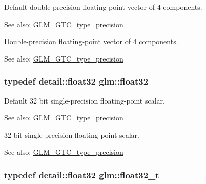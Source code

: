 Default double-precision floating-point vector of 4 components. \begin{Desc}
\item[See also:]\hyperlink{group__gtc__type__precision}{GLM\_\-GTC\_\-type\_\-precision}\end{Desc}
Double-precision floating-point vector of 4 components. \begin{Desc}
\item[See also:]\hyperlink{group__gtc__type__precision}{GLM\_\-GTC\_\-type\_\-precision} \end{Desc}
\hypertarget{group__gtc__type__precision_g814f2f65354b6588b067cc5c67a6b340}{
\subsubsection[float32]{\setlength{\rightskip}{0pt plus 5cm}typedef detail::float32 {\bf glm::float32}}}
\label{group__gtc__type__precision_g814f2f65354b6588b067cc5c67a6b340}


Default 32 bit single-precision floating-point scalar. \begin{Desc}
\item[See also:]\hyperlink{group__gtc__type__precision}{GLM\_\-GTC\_\-type\_\-precision}\end{Desc}
32 bit single-precision floating-point scalar. \begin{Desc}
\item[See also:]\hyperlink{group__gtc__type__precision}{GLM\_\-GTC\_\-type\_\-precision} \end{Desc}
\hypertarget{group__gtc__type__precision_g642737ae3e7c434b366f2191e6944bf2}{
\subsubsection[float32\_\-t]{\setlength{\rightskip}{0pt plus 5cm}typedef detail::float32 {\bf glm::float32\_\-t}}}
\label{group__gtc__type__precision_g642737ae3e7c434b366f2191e6944bf2}


